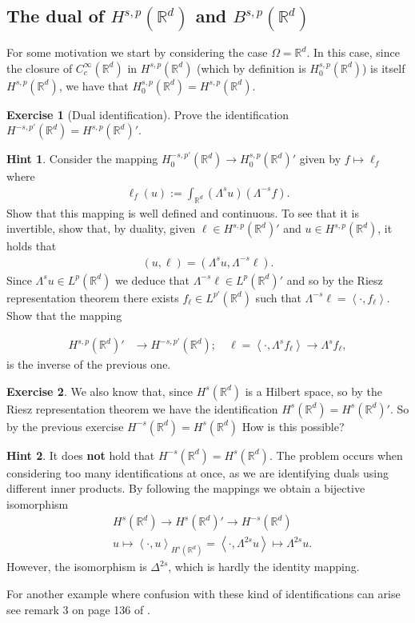 \documentclass[
    a4paper,
    DIV=14,
    abstract=true,
    numbers=noenddot
]
{scrartcl}
\theoremstyle{definition}
\newtheorem{exercise}{Exercise}
\newtheorem*{hint}{Hint}
\newcommand{\br}[1]{\left\langle#1\right\rangle}
\newcommand{\R}{\mathbb{R}}
\begin{document}
\subsection{The dual of $H^{s,p}(\R^d)$ and $B^{s,p}(\R^d)$}
For some motivation we start by considering the case $\Omega =\R^d$. In this case, since the closure of
$C_c^\infty(\R^d)$ in $H^{s,p}(\R^d)$ (which by definition is $H_0^{s,p}(\R^d)$) is itself $H^{s,p}(\R^d)$, we have that $H_0^{s,p}(\R^d)=H^{s,p}(\R^d)$.
\begin{exercise}[Dual identification]\label{dual exercise}
    Prove the identification $H^{-s,p'}(\R^d)=H^{s,p}(\R^d)'$.
\end{exercise}
\begin{hint}

    Consider the mapping  $H_0^{-s,p'}(\R^d) \to H^{s,p}_0(\R^d)'$ given by $f \mapsto \ell_f$ where
    \begin{align*}
        \ell_f(u):= \int_{\R^d}(\Lambda^s u)(\Lambda ^{-s}f).
    \end{align*}
    Show that this mapping is well defined and continuous. To see that it is invertible, show that, by duality, given $\ell \in H^{s,p}(\R^d)'$ and $u \in H^{s,p}(\R^d)$, it holds that
    \begin{align*}
        (u,\ell )=(\Lambda ^s u,\Lambda ^{-s}\ell ).
    \end{align*}
    Since $ \Lambda ^s u \in L^p(\R^d)$ we deduce that $\Lambda ^{-s}\ell \in L^{p}(\R^d)'$ and so by the Riesz representation theorem there exists $f_\ell \in L^{p'}(\R^d)$ such that $\Lambda ^{-s}\ell =\br{\cdot,f_\ell}$. Show that the mapping

    \begin{align*}
        H^{s,p}(\R^d)'                & \longrightarrow H^{-s,p'}(\R^d); \quad \ell = \br{\cdot, \Lambda^s  f_\ell} \to \Lambda^s  f_\ell,\end{align*}
    is the inverse of the previous one.
\end{hint}
\begin{exercise}
    We also know that, since $H^{s}(\R^d)$ is a Hilbert space, so by the Riesz representation theorem we have the identification $H^s(\R^d) = H^{s}(\R^d)'$. So by the previous exercise $H^{-s}(\R^d)= H^s(\R^d)$ How is this possible?
\end{exercise}
\begin{hint}
    It does \textbf{not} hold that $H^{-s}(\R^d)= H^s(\R^d)$. The problem occurs when considering too many identifications at once, as we are identifying duals using different inner products. By following the mappings we obtain a bijective isomorphism
    \begin{align*}
         & H^{s}(\R^d) \to  H^s(\R^d)' \to H^{-s}(\R^d)                                                    \\
         & u \longmapsto   \br{\cdot, u}_{H^s(\R^d)}= \br{\cdot, \Lambda^{2s} u } \mapsto \Lambda ^{2s} u.
    \end{align*}
    However, the isomorphism is $\Delta ^{2s}$, which is  hardly the identity mapping.
\end{hint}
For another example where confusion with these kind of identifications can arise see remark 3 on page  136 of \cite{brezis2011functional}.
\end{document}
